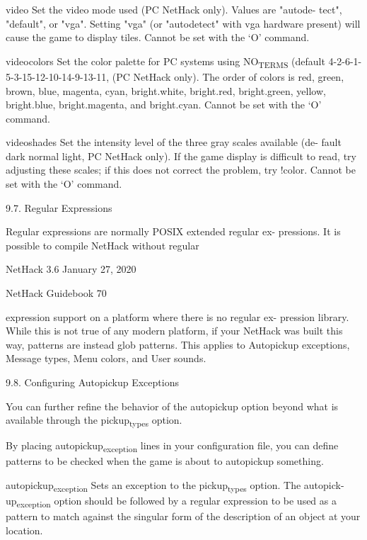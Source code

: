 \documentclass[11pt]{article}
\begin{document}
video
 Set the video mode used (PC NetHack only). Values are "autode-
 tect", "default", or "vga".  Setting "vga" (or "autodetect"
 with vga hardware present) will cause the game to display
 tiles. Cannot be set with the `O' command.

videocolors
 Set the color palette for PC systems using NO\textsubscript{TERMS} (default
 4-2-6-1-5-3-15-12-10-14-9-13-11, (PC NetHack only). The order
 of colors is red, green, brown,  blue,  magenta,  cyan,
 bright.white, bright.red, bright.green, yellow, bright.blue,
 bright.magenta, and bright.cyan. Cannot be set with the `O'
 command.

videoshades
 Set the intensity level of the three gray scales available (de-
 fault dark normal light, PC NetHack only). If the game display
 is difficult to read, try adjusting these scales; if this does
 not correct the problem, try !color. Cannot be set with the
 `O' command.

9.7. Regular Expressions

   Regular expressions are normally POSIX extended regular ex-
pressions. It is possible to compile NetHack without regular


NetHack 3.6                   January 27, 2020





NetHack Guidebook                       70



expression support on a platform where there is no regular ex-
pression library. While this is not true of any modern platform,
if your NetHack was built this way, patterns are instead glob
patterns. This applies to Autopickup exceptions, Message types,
Menu colors, and User sounds.

9.8. Configuring Autopickup Exceptions

   You can further refine the behavior of the autopickup option
beyond what is available through the pickup\textsubscript{types} option.

   By placing autopickup\textsubscript{exception} lines in your configuration
file, you can define patterns to be checked when the game is
about to autopickup something.

autopickup\textsubscript{exception}
 Sets an exception to the pickup\textsubscript{types} option.  The autopick-
 up\textsubscript{exception} option should be followed by a regular expression
 to be used as a pattern to match against the singular form of
 the description of an object at your location.
\end{document}
